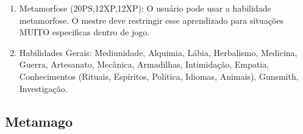 \begin{enumerate}
		\item Metamorfose (20PS,12XP,12XP): O usuário pode usar a habilidade metamorfose. O mestre deve restringir esse aprendizado para situações MUITO especificas dentro de jogo.

	
	\item Habilidades Gerais: Mediunidade, Alquimia, Lábia, Herbalismo, Medicina, Guerra, Artesanato, Mecânica, Armadilhas, Intimidação, Empatia, Conhecimentos (Rituais, Espíritos, Política, Idiomas, Animais), Gunsmith, Investigação.
\end{enumerate}


\subsection{Metamago}
  
